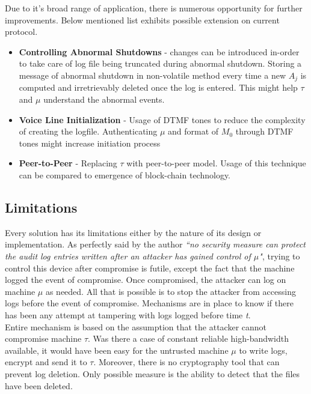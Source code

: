 \documentclass[12pt, letter]{article}
\begin{document}
Due to it's broad range of application, there is numerous opportunity for further improvements. Below mentioned list exhibits possible extension on current protocol.

\begin{itemize}
    \item \textbf{Controlling Abnormal Shutdowns} - changes can be introduced in-order to take care of log file being truncated during abnormal shutdown. Storing a message of abnormal shutdown in non-volatile method every time a new $A_j$ is computed and irretrievably deleted once the log is entered. This might help $\tau$ and $\mu$ understand the abnormal events.
    
    \item \textbf{Voice Line Initialization} - Usage of DTMF tones to reduce the complexity of creating the logfile. Authenticating $\mu$ and format of $M_0$ through DTMF tones might increase initiation process 
    
    \item \textbf{Peer-to-Peer} - Replacing $\tau$ with peer-to-peer model. Usage of this technique can be compared to emergence of block-chain technology.
\end{itemize}

\subsection{Limitations}
\label{sec:limitation}

Every solution has its limitations either by the nature of its design or implementation. As perfectly said by the author \textit{``no security measure can protect the audit log entries written after an attacker has gained control of $\mu$"}, trying to control this device after compromise is futile, except the fact that the machine logged the event of compromise. Once compromised, the attacker can log on machine $\mu$ as needed. All that is possible is to stop the attacker from accessing logs before the event of compromise. Mechanisms are in place to know if there has been any attempt at tampering with logs logged before time \textit{t}.\\

Entire mechanism is based on the assumption that the attacker cannot compromise machine $\tau$. Was there a case of constant reliable high-bandwidth available, it would have been easy for the untrusted machine $\mu$ to write logs, encrypt and send it to $\tau$. Moreover, there is no cryptography tool that can prevent log deletion. Only possible measure is the ability to detect that the files have been deleted.\\
\end{document}
